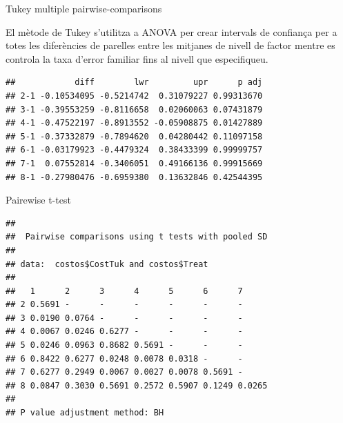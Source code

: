 \documentclass[11pt,a4paper]{article}\usepackage[]{graphicx}\usepackage[]{color}
\makeatletter
\newenvironment{kframe}{%
 \def\at@end@of@kframe{}%
 \ifinner\ifhmode%
  \def\at@end@of@kframe{\end{minipage}}%
  \begin{minipage}{\columnwidth}%
 \fi\fi%
 \def\FrameCommand##1{\hskip\@totalleftmargin \hskip-\fboxsep
 \colorbox{shadecolor}{##1}\hskip-\fboxsep
     \hskip-\linewidth \hskip-\@totalleftmargin \hskip\columnwidth}%
 \MakeFramed {\advance\hsize-\width
   \@totalleftmargin\z@ \linewidth\hsize
   \@setminipage}}%
 {\par\unskip\endMakeFramed%
 \at@end@of@kframe}
\newenvironment{knitrout}{}{} %
\makeatother
\begin{document}
Tukey multiple pairwise-comparisons

El mètode de Tukey s'utilitza a ANOVA per crear intervals de confiança per a totes les diferències de parelles entre les mitjanes de nivell de factor mentre es controla la taxa d'error familiar fins al nivell que especifiqueu. 

\begin{knitrout}
\color{fgcolor}\begin{kframe}
\begin{verbatim}
##            diff        lwr         upr      p adj
## 2-1 -0.10534095 -0.5214742  0.31079227 0.99313670
## 3-1 -0.39553259 -0.8116658  0.02060063 0.07431879
## 4-1 -0.47522197 -0.8913552 -0.05908875 0.01427889
## 5-1 -0.37332879 -0.7894620  0.04280442 0.11097158
## 6-1 -0.03179923 -0.4479324  0.38433399 0.99999757
## 7-1  0.07552814 -0.3406051  0.49166136 0.99915669
## 8-1 -0.27980476 -0.6959380  0.13632846 0.42544395
\end{verbatim}
\end{kframe}
\end{knitrout}

Pairewise t-test

\begin{knitrout}
\color{fgcolor}\begin{kframe}
\begin{verbatim}
## 
## 	Pairwise comparisons using t tests with pooled SD 
## 
## data:  costos$CostTuk and costos$Treat 
## 
##   1      2      3      4      5      6      7     
## 2 0.5691 -      -      -      -      -      -     
## 3 0.0190 0.0764 -      -      -      -      -     
## 4 0.0067 0.0246 0.6277 -      -      -      -     
## 5 0.0246 0.0963 0.8682 0.5691 -      -      -     
## 6 0.8422 0.6277 0.0248 0.0078 0.0318 -      -     
## 7 0.6277 0.2949 0.0067 0.0027 0.0078 0.5691 -     
## 8 0.0847 0.3030 0.5691 0.2572 0.5907 0.1249 0.0265
## 
## P value adjustment method: BH
\end{verbatim}
\end{kframe}
\end{knitrout}
\end{document}
